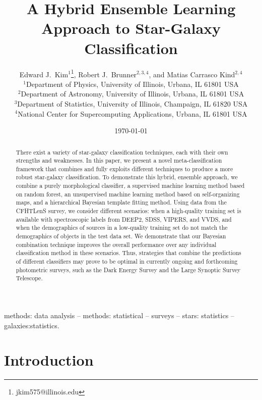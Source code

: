\documentclass[useAMS,usenatbib]{mn2e}
\title{A Hybrid Ensemble Learning Approach to Star-Galaxy Classification}
\author[E. J. Kim, R. J. Brunner \& M. Carrasco Kind]{
  Edward J.~Kim$^1$\thanks{jkim575@illinois.edu},
  Robert J.~Brunner$^{2,3,4}$,
  and Matias Carrasco Kind$^{2,4}$\\
$^1$Department of Physics, University of Illinois, Urbana, IL 61801 USA\\
$^2$Department of Astronomy, University of Illinois, Urbana, IL 61801 USA\\
$^3$Department of Statistics, University of Illinois, Champaign, IL 61820 USA\\
$^4$National Center for Supercomputing Applications, Urbana, IL 61801 USA}
\begin{document}
\date{\today}

\pagerange{\pageref{firstpage}--\pageref{lastpage}} 

\maketitle

\label{firstpage}
\begin{abstract}
There exist a variety of star-galaxy classification techniques,
each with their own strengths and weaknesses.
In this paper, we present a novel meta-classification
framework that combines and fully exploits different techniques
to produce a more robust star-galaxy classification.
To demonstrate this hybrid, ensemble approach,
we combine a purely morphological classifier,
a supervised machine learning method based on random forest,
an unsupervised machine learning method based on self-organizing maps,
and a hierarchical Bayesian template fitting method.
Using data from the CFHTLenS survey,
we consider different scenarios:
when a high-quality training set is available with spectroscopic labels from
DEEP2, SDSS, VIPERS, and VVDS, and
when the demographics of sources in a low-quality training set
do not match the demographics of objects in the test data set.
We demonstrate that our Bayesian combination technique improves
the overall performance over any individual classification method
in these scenarios.
Thus, strategies that combine the predictions of different classifiers
may prove to be optimal in currently ongoing and forthcoming
photometric surveys,
such as the Dark Energy Survey and the Large Synoptic Survey Telescope.

\end{abstract}

\begin{keywords}
methods: data analysis -- methods: statistical -- surveys -- stars: statistics
-- galaxies:statistics.
\end{keywords}


\section{Introduction}
  \label{section:introduction}
\end{document}
